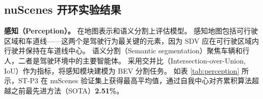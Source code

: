 \documentclass[runningheads]{llncs}
\begin{document}
\subsection{nuScenes 开环实验结果}\label{sec: res-nuscenes}




\textbf{感知（Perception）。} 在地图表示和语义分割上评估模型。
%
感知地图包括可行驶区域和车道线——这两个是驾驶行为最关键的元素，因为 SDV 应在可行驶区域内行驶并保持在车道线中心。
%
语义分割（Semantic segmentation）聚焦车辆和行人，二者是驾驶环境中的主要智能体。
%
采用交并比（Intersection-over-Union, IoU）作为指标，将感知模块建模为 BEV 分割任务。
%
如表 \ref{tab:perception} 所示，ST-P3 在 nuScenes 验证集上获得最高平均值，通过自我中心对齐累积算法超越之前最先进方法（SOTA）\textbf{2.51\%}。
%
\end{document}
